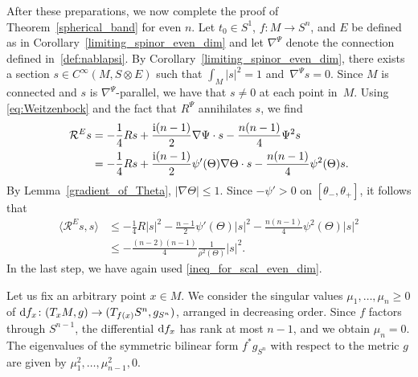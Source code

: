 \documentclass[pdftex]{sigma}
\numberwithin{equation}{section}
\begin{document}
After these preparations, we now complete the proof of Theorem~\ref{spherical_band} for even $n$.
Let $t_0 \in S^1$, $f\colon M \to S^n$, and $E$ be defined as in Corollary~\ref{limiting_spinor_even_dim} and let $\nabla^\Psi$ denote the connection defined in~\eqref{def:nablapsi}.
By Corollary~\ref{limiting_spinor_even_dim}, there exists a section $s \in C^\infty(M,S \otimes E)$ such that $\int_M |s|^2 = 1$ and~${\nabla^\Psi s = 0}$.
Since $M$ is connected and $s$ is $\nabla^\Psi$-parallel, we have that $s \neq 0$ at each point in~$M$. Using \eqref{eq:Weitzenbock} and the fact that $R^\Psi$ annihilates $s$, we find
\begin{align*}
\mathcal{R}^E s
&=
-\frac{1}{4} R s + \frac{{\rm i}(n-1)}{2} \nabla \Psi \cdot s - \frac{n(n-1)}{4} \Psi^2 s \\
&=
-\frac{1}{4} R s + \frac{{\rm i}(n-1)}{2} \psi'(\Theta) \nabla\Theta \cdot s - \frac{n(n-1)}{4} \psi^2(\Theta) s .
\end{align*}
By Lemma~\ref{gradient_of_Theta}, $|\nabla \Theta| \leq 1$. Since $-\psi' > 0$ on $[\theta_-,\theta_+]$, it follows that{\samepage
\begin{align}
\big\langle \mathcal{R}^E s,s \big\rangle
&\leq
-\frac{1}{4} R |s|^2 - \frac{n-1}{2} \psi'(\Theta) |s|^2 - \frac{n(n-1)}{4} \psi^2(\Theta) |s|^2\nonumber \\
&\leq
-\frac{(n-2)(n-1)}{4} \frac{1}{\rho^2(\Theta)} |s|^2. \label{estimate_curvature_E}
\end{align}
In the last step, we have again used \eqref{ineq_for_scal_even_dim}.}

Let us fix an arbitrary point $x \in M$. We consider the singular values $\mu_1, \ldots, \mu_n \geq 0$ of ${\rm d}f_x\colon (T_x M,g) \to (T_{f(x)} S^n,g_{S^n})$, arranged in decreasing order. Since $f$ factors through $S^{n-1}$, the differential ${\rm d}f_x$ has rank at most $n-1$, and we obtain $\mu_n = 0$. The eigenvalues of the symmetric bilinear form $f^* g_{S^n}$ with respect to the metric $g$ are given by $\mu_1^2,\hdots,\mu_{n-1}^2,0$.
\end{document}

